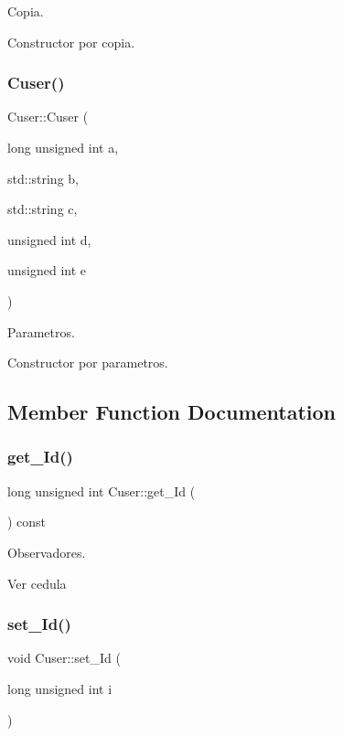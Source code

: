 Copia. 

Constructor por copia. \mbox{\label{class_cuser_ab027c481fee361a5c982c2a3f1a3c266}} 
\subsubsection{\texorpdfstring{Cuser()}{Cuser()}\hspace{0.1cm}{\footnotesize\ttfamily [3/3]}}
{\footnotesize\ttfamily Cuser\+::\+Cuser (\begin{DoxyParamCaption}\item[{long unsigned int}]{a,  }\item[{std\+::string}]{b,  }\item[{std\+::string}]{c,  }\item[{unsigned int}]{d,  }\item[{unsigned int}]{e }\end{DoxyParamCaption})}



Parametros. 

Constructor por parametros. 

\subsection{Member Function Documentation}
\mbox{\label{class_cuser_a165c1134c4e711e74c8a8cc9e286f472}} 
\subsubsection{\texorpdfstring{get\+\_\+\+Id()}{get\_Id()}}
{\footnotesize\ttfamily long unsigned int Cuser\+::get\+\_\+\+Id (\begin{DoxyParamCaption}{ }\end{DoxyParamCaption}) const}



Observadores. 

Ver cedula \mbox{\label{class_cuser_ac9b053ea69951747707f223d882a8520}} 
\subsubsection{\texorpdfstring{set\+\_\+\+Id()}{set\_Id()}}
{\footnotesize\ttfamily void Cuser\+::set\+\_\+\+Id (\begin{DoxyParamCaption}\item[{long unsigned int}]{i }\end{DoxyParamCaption})}



